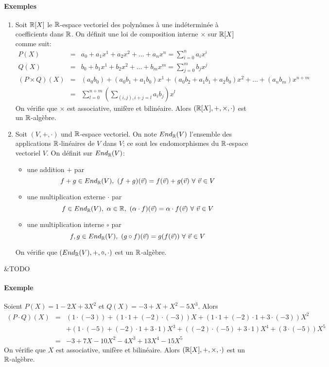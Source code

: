 \paragraph{Exemples}
\begin{enumerate}[1)]
  \item Soit $\mathbb{R}[X]$ le $\mathbb{R}$-espace vectoriel des polynômes à une indéterminée à  coefficients dans $\mathbb{R}$. On définit une loi de composition interne $\times$ sur $\mathbb{R}[X]$ comme suit:
    \begin{eqnarray*}
      P(X) &=& a_0 + a_1 x^1 + a_2 x^2 + \ldots + a_n x^n = \sum_{i=0}^{n} a_i x^i \\
      Q(X) &=& b_0 + b_1 x^1 + b_2 x^2 + \ldots + b_m x^m = \sum_{j=0}^{m} b_j x^j \\
      (P \times Q)(X) &=& (a_0 b_0) + (a_0 b_1 + a_1 b_0) x^1 + (a_0 b_2 + a_1 b_1 + a_2 b_0) x^2 + \ldots + (a_n b_m) x^{n+m} \\
        &=& \sum_{l=0}^{n+m} \left ( \sum_{(i, j), i+j=l} a_i b_j \right ) x^l
    \end{eqnarray*}
    On vérifie que $\times$ est associative, unifère et bilinéaire. Alors $(\mathbb{R}[X], + , \times, \cdot)$ est un $\mathbb{R}$-algèbre.
    
  \item Soit $(V, +, \cdot)$ und $\mathbb{R}$-espace vectoriel. On note $End_{\mathbb{R}}(V)$ l'ensemble des applications $\mathbb{R}$-linéaires de $V$ dans $V$; ce sont les endomorphismes du $\mathbb{R}$-espace vectoriel $V$. On définit sur $End_{\mathbb{R}}(V)$:
    \begin{itemize}
      \item une addition $+$ par
        $$f+g \in End_{\mathbb{R}}(V), ~ (f+g)(\vec{v}) = f(\vec{v}) + g(\vec{v}) ~ \forall ~ \vec{v} \in V$$
      \item une multiplication externe $\cdot$ par
        $$f \in End_{\mathbb{R}}(V), ~ \alpha \in \mathbb{R}, ~ (\alpha \cdot f)(\vec{v}) = \alpha \cdot f(\vec{v}) ~ \forall ~ \vec{v} \in V$$
      \item une multiplication interne $\circ$ par
        $$f, g \in End_{\mathbb{R}}(V), ~ (g \circ f)(\vec{v}) = g(f(\vec{v})) ~ \forall ~ \vec{v} \in V$$
    \end{itemize} 
    On vérifie que $(End_{\mathbb{R}}(V), +, \circ, \cdot)$ est un $\mathbb{R}$-algèbre.
\end{enumerate}

&TODO
\paragraph{Exemple} Soient $P(X) = 1 - 2 X + 3 X^2$ et $Q(X) = -3 + X + X^2 - 5 X^3$. Alors
\begin{eqnarray*}
  (P \cdot Q)(X) &=& (1 \cdot (-3)) + (1 \cdot 1 + (-2) \cdot (-3)) X + (1 \cdot 1 + (-2) \cdot 1 + 3 \cdot (-3)) X^2 \\
    && +(1 \cdot (-5) + (-2) \cdot 1 + 3 \cdot 1) X^3 + ((-2) \cdot (-5) + 3 \cdot 1) X^4 + (3 \cdot (-5)) X^5 \\
  &=& -3 + 7 X - 10 X^2 - 4 X^3 + 13 X^4 - 15 X^5
\end{eqnarray*}
On vérifie que $X$ est associative, unifère et bilinéaire. Alors $(\mathbb{R}[X],+ ,\times ,\cdot)$ est un $\mathbb{R}$-algèbre.
